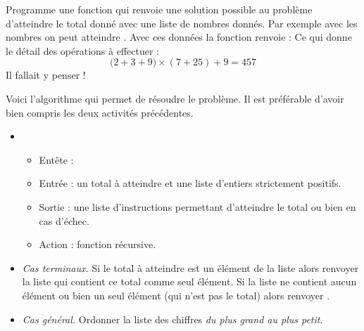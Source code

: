 \documentclass[11pt,class=report,crop=false]{standalone}
\begin{document}

\begin{activite}
   
 
 
Programme une fonction  qui renvoie une solution possible au problème d'atteindre le total donné avec une liste de nombres donnés.
Par exemple avec les nombres  on peut atteindre .
Avec ces données la fonction  renvoie :
\mycenterline{\ci{['2+3=5', '5+9=14', '7+25=32', '14*32=448', '9+448=457', '457']}}
Ce qui donne le détail des opérations à effectuer :
$$\big(2+3+9)\times(7+25)+9 = 457$$
Il fallait y penser !


Voici l'algorithme qui permet de résoudre le problème. Il est préférable d'avoir bien compris les deux activités précédentes.
\begin{algorithme}
\sauteligne 
  
\begin{itemize}
  \item 
  \begin{itemize}
   \item Entête : 
   
   \item Entrée : un total à atteindre et une liste d'entiers strictement positifs.
   
   \item Sortie : une liste d'instructions permettant d'atteindre le total ou bien  en cas d'échec.
 
   \item Action : fonction récursive.
  \end{itemize}

   \item \emph{Cas terminaux.} Si le total à atteindre est un élément de la liste  alors renvoyer la liste \ci{[total]} qui contient ce total comme seul élément.
Si la liste  ne contient aucun élément ou bien un seul élément (qui n'est pas le total) alors renvoyer .
   
   \item \emph{Cas général.}
   Ordonner la liste des chiffres \emph{du plus grand au plus petit}. 
   

\end{itemize}
\end{algorithme}
\end{activite}
\end{document}
